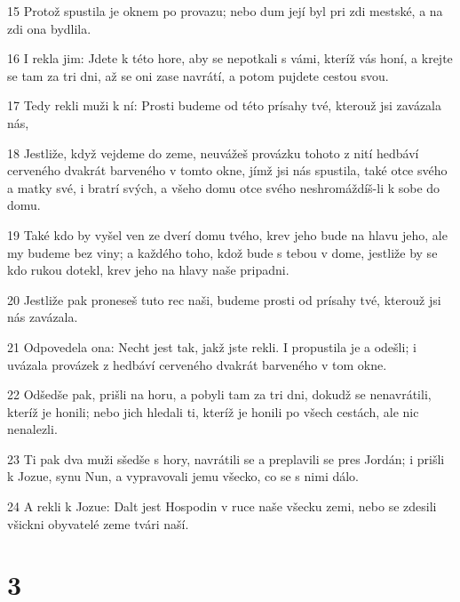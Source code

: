 \par 15 Protož spustila je oknem po provazu; nebo dum její byl pri zdi mestské, a na zdi ona bydlila.
\par 16 I rekla jim: Jdete k této hore, aby se nepotkali s vámi, kteríž vás honí, a krejte se tam za tri dni, až se oni zase navrátí, a potom pujdete cestou svou.
\par 17 Tedy rekli muži k ní: Prosti budeme od této prísahy tvé, kterouž jsi zavázala nás,
\par 18 Jestliže, když vejdeme do zeme, neuvážeš provázku tohoto z nití hedbáví cerveného dvakrát barveného v tomto okne, jímž jsi nás spustila, také otce svého a matky své, i bratrí svých, a všeho domu otce svého neshromáždíš-li k sobe do domu.
\par 19 Také kdo by vyšel ven ze dverí domu tvého, krev jeho bude na hlavu jeho, ale my budeme bez viny; a každého toho, kdož bude s tebou v dome, jestliže by se kdo rukou dotekl, krev jeho na hlavy naše pripadni.
\par 20 Jestliže pak proneseš tuto rec naši, budeme prosti od prísahy tvé, kterouž jsi nás zavázala.
\par 21 Odpovedela ona: Necht jest tak, jakž jste rekli. I propustila je a odešli; i uvázala provázek z hedbáví cerveného dvakrát barveného v tom okne.
\par 22 Odšedše pak, prišli na horu, a pobyli tam za tri dni, dokudž se nenavrátili, kteríž je honili; nebo jich hledali ti, kteríž je honili po všech cestách, ale nic nenalezli.
\par 23 Ti pak dva muži sšedše s hory, navrátili se a preplavili se pres Jordán; i prišli k Jozue, synu Nun, a vypravovali jemu všecko, co se s nimi dálo.
\par 24 A rekli k Jozue: Dalt jest Hospodin v ruce naše všecku zemi, nebo se zdesili všickni obyvatelé zeme tvári naší.

\chapter{3}


